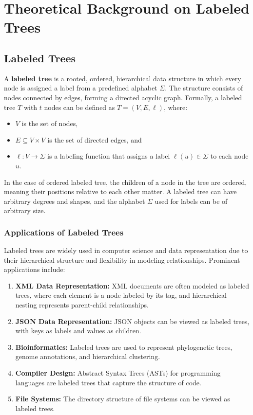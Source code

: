 \section{Theoretical Background on Labeled Trees}

\subsection{Labeled Trees}
A \textbf{labeled tree} is a rooted, ordered, hierarchical data structure in which every node is assigned a label from a predefined alphabet $\Sigma$. The structure consists of nodes connected by edges, forming a directed acyclic graph. Formally, a labeled tree $T$ with $t$ nodes can be defined as $T = (V, E, \ell)$, where:
\begin{itemize}
    \item $V$ is the set of nodes,
    \item $E \subseteq V \times V$ is the set of directed edges, and
    \item $\ell: V \to \Sigma$ is a labeling function that assigns a label $\ell(u) \in \Sigma$ to each node $u$.
\end{itemize}

In the case of ordered labeled tree, the children of a node in the tree are ordered, meaning their positions relative to each other matter. A labeled tree can have arbitrary degrees and shapes, and the alphabet $\Sigma$ used for labels can be of arbitrary size.

\subsubsection{Applications of Labeled Trees}
Labeled trees are widely used in computer science and data representation due to their hierarchical structure and flexibility in modeling relationships. Prominent applications include:
\begin{enumerate}
    \item \textbf{XML Data Representation:} XML documents are often modeled as labeled trees, where each element is a node labeled by its tag, and hierarchical nesting represents parent-child relationships.
    \item \textbf{JSON Data Representation:} JSON objects can be viewed as labeled trees, with keys as labels and values as children.
    \item \textbf{Bioinformatics:} Labeled trees are used to represent phylogenetic trees, genome annotations, and hierarchical clustering.
    \item \textbf{Compiler Design:} Abstract Syntax Trees (ASTs) for programming languages are labeled trees that capture the structure of code.
    \item \textbf{File Systems:} The directory structure of file systems can be viewed as labeled trees.
\end{enumerate}

